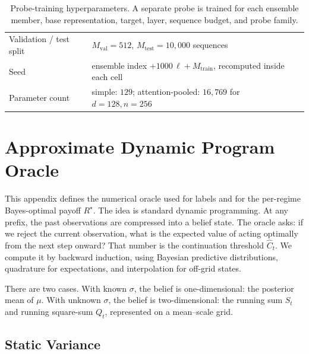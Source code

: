 \documentclass[11pt]{article}
\begin{document}
\begin{table}[H]
\begin{tabular}{p{} p{}}
Validation / test split & \(M_{\mathrm{val}}=512\), \(M_{\mathrm{test}}=10{,}000\) sequences \\
Seed & ensemble index \(+1000\,\ell+M_{\mathrm{train}}\), recomputed inside each cell \\
Parameter count & simple: \(129\); attention-pooled: \(16{,}769\) for \(d=128,n=256\) \\
\hline
\end{tabular}
\caption{Probe-training hyperparameters. A separate probe is trained for each ensemble member, base representation, target, layer, sequence budget, and probe family.}
\label{tab:probe-training-hparams}
\end{table}

\section{Approximate Dynamic Program Oracle}
\label{app:adp}

This appendix defines the numerical oracle used for labels and for the per-regime Bayes-optimal payoff \(R^\star\). The idea is standard dynamic programming. At any prefix, the past observations are compressed into a belief state. The oracle asks: if we reject the current observation, what is the expected value of acting optimally from the next step onward? That number is the continuation threshold \(\widehat C_t\). We compute it by backward induction, using Bayesian predictive distributions, quadrature for expectations, and interpolation for off-grid states.

There are two cases. With known \(\sigma\), the belief is one-dimensional: the posterior mean of \(\mu\). With unknown \(\sigma\), the belief is two-dimensional: the running sum \(S_t\) and running square-sum \(Q_t\), represented on a mean--scale grid.

\subsection{Static Variance}
\label{app:adp-static}
\end{document}

